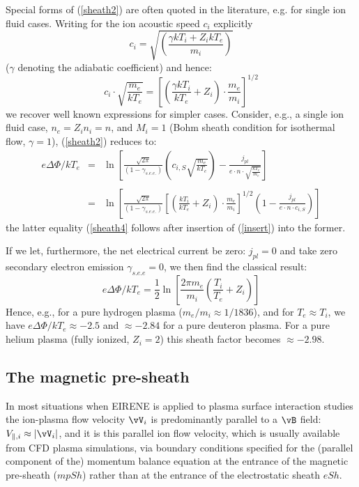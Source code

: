 Special forms of (\ref{sheath2}) are often quoted in the
literature, e.g. for single ion fluid cases. Writing for the ion acoustic speed $c_i$ explicitly
\begin{displaymath}
c_i = \sqrt{\left(\frac{\gamma kT_i + Z_i kT_e}{m_i}\right)}
\end{displaymath}
($\gamma$ denoting the adiabatic coefficient) and hence:
\begin{equation}\label{insert}
c_i \cdot \sqrt{ \frac{m_e}{kT_e} } = \left[ \left( \frac{\gamma
kT_i}{kT_e} + Z_i \right) \cdot \frac{m_e}{m_i} \right]^{1/2}
\end{equation}
we recover well known expressions for simpler cases. Consider,
e.g., a single ion fluid case, $n_e = Z_i n_i = n$,  and
$M_i = 1$ (Bohm sheath condition for isothermal flow, $\gamma =
1$), (\ref{sheath2}) reduces to:
\begin{eqnarray} \label{sheath3}
 e \Delta\Phi/kT_e & = &
\ln\left[\frac{\sqrt{2\pi}}{(1-\gamma_{s.e.e.})}
\left({c_{i,S}}
\sqrt{\frac{m_e}{kT_e}}\right)-\frac{j_{pl}}{e \cdot n \cdot
\sqrt{\frac{kT_e}{m_e}}}\right]\nonumber \\&&\\
& = &
\ln\left[\frac{\sqrt{2\pi}}{(1-\gamma_{s.e.e.})}
\left[ \left( \frac{
kT_i}{kT_e} + Z_i \right) \cdot \frac{m_e}{m_i} \right]^{1/2}\left(1-\frac{j_{pl}}{e \cdot n \cdot
c_{i,S}}\right)\right]
\label{sheath4}
\end{eqnarray}
the latter equality (\ref{sheath4} follows after insertion of (\ref{insert}) into the former.



If we let, furthermore, the net electrical current be zero: $j_{pl} = 0$ and take
zero secondary electron emission $\gamma_{s.e.e} = 0$, we then find the classical result:
\begin{displaymath}
 e \Delta\Phi/kT_e = \frac{1}{2} \ln{ \left[ \frac {2\pi
m_e}{m_i} \left( \frac{T_i}{T_e} + Z_i \right) \right]}
\end{displaymath}
Hence, e.g.,  for a pure hydrogen plasma ($m_e/m_i \approx 1/1836$), and for $T_e \approx
T_i$, we have $e \Delta\Phi/kT_e \approx -2.5 $ and $ \approx
-2.84$ for a pure deuteron plasma. For a pure helium plasma (fully ionized,
$Z_i=2$) this sheath factor becomes $\approx -2.98$.


\subsection{The magnetic pre-sheath} \label{sec1.4.2}
In most situations when EIRENE is applied to plasma surface interaction studies the ion-plasma flow velocity $\vV_i$
is predominantly parallel to a $\vB$ field: $V_{\parallel,i} \approx |\vV_i|$, and it is this parallel ion flow velocity,
which is usually available from CFD plasma simulations, via boundary conditions specified for the (parallel component of the) momentum balance equation
at the entrance of the magnetic pre-sheath ($mpSh$) rather than at the entrance of the electrostatic sheath $eSh$.


